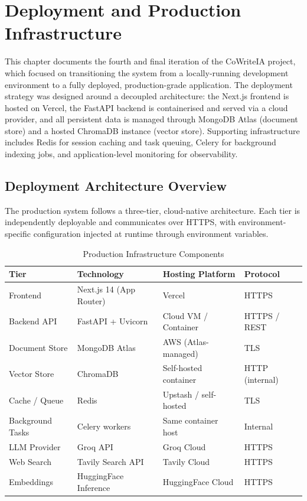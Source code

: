 \chapter{Deployment and Production Infrastructure}
\label{ch:deployment}
\sloppy
\setlength{\emergencystretch}{3em}

This chapter documents the fourth and final iteration of the CoWriteIA project, which focused on transitioning the system from a locally-running development environment to a fully deployed, production-grade application. The deployment strategy was designed around a decoupled architecture: the Next.js frontend is hosted on Vercel, the FastAPI backend is containerised and served via a cloud provider, and all persistent data is managed through MongoDB Atlas (document store) and a hosted ChromaDB instance (vector store). Supporting infrastructure includes Redis for session caching and task queuing, Celery for background indexing jobs, and application-level monitoring for observability.

\section{Deployment Architecture Overview}
\label{sec:deployment-overview}

The production system follows a three-tier, cloud-native architecture. Each tier is independently deployable and communicates over HTTPS, with environment-specific configuration injected at runtime through environment variables.

\begin{table}[H]
\centering
\begin{tabular}{|p{3.5cm}|p{4cm}|p{4cm}|p{2.5cm}|}
\hline
\textbf{Tier} & \textbf{Technology} & \textbf{Hosting Platform} & \textbf{Protocol} \\
\hline
Frontend & Next.js 14 (App Router) & Vercel & HTTPS \\
\hline
Backend API & FastAPI + Uvicorn & Cloud VM / Container & HTTPS / REST \\
\hline
Document Store & MongoDB Atlas & AWS (Atlas-managed) & TLS \\
\hline
Vector Store & ChromaDB & Self-hosted container & HTTP (internal) \\
\hline
Cache / Queue & Redis & Upstash / self-hosted & TLS \\
\hline
Background Tasks & Celery workers & Same container host & Internal \\
\hline
LLM Provider & Groq API & Groq Cloud & HTTPS \\
\hline
Web Search & Tavily Search API & Tavily Cloud & HTTPS \\
\hline
Embeddings & HuggingFace Inference & HuggingFace Cloud & HTTPS \\
\hline
\end{tabular}
\caption{Production Infrastructure Components}
\label{tab:infra-components}
\end{table}

